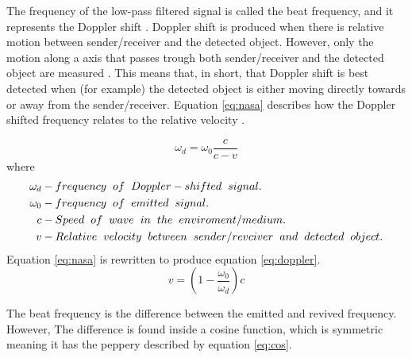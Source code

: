 The frequency of the low-pass filtered signal is called the beat frequency, and it represents the Doppler shift \cite{douglas2022fmcw}. Doppler shift is produced when there is relative motion between sender/receiver and the detected object. However, only the motion along a axis that passes trough both sender/receiver and the detected object are measured \cite{cwradar}. This means that, in short, that Doppler shift is best detected when (for example) the detected object is either moving directly towards or away from the sender/receiver. Equation \ref{eq:nasa} describes how the Doppler shifted frequency relates to the relative velocity \cite{doppler_effect_nasa}.

\begin{equation} \label{eq:nasa}
    \omega_d = \omega_0 \frac{c}{c - v} 
\end{equation}
where 
\begin{align*} 
\omega_d   & - frequency \hspace{2mm} of \hspace{2mm} Doppler-shifted \hspace{2mm} signal.\\
\omega_0   & - frequency \hspace{2mm} of \hspace{2mm} emitted \hspace{2mm} signal.\\
c   & - Speed \hspace{2mm} of \hspace{2mm} wave \hspace{2mm} in \hspace{2mm} the \hspace{2mm} enviroment/medium.\\
v   & - Relative \hspace{2mm} velocity \hspace{2mm} between \hspace{2mm} sender/revciver \hspace{2mm} and \hspace{2mm} detected \hspace{2mm} object.\\
\end{align*}  
Equation \ref{eq:nasa} is rewritten to produce equation \ref{eq:doppler}.
\begin{equation} \label{eq:doppler}
    v = \left( 1 - \frac{\omega_0}{\omega_d} \right) c
\end{equation}

The beat frequency is the difference between the emitted and revived frequency. However, The difference is found inside a cosine function, which is symmetric meaning it has the peppery described by equation \ref{eq:cos}.

